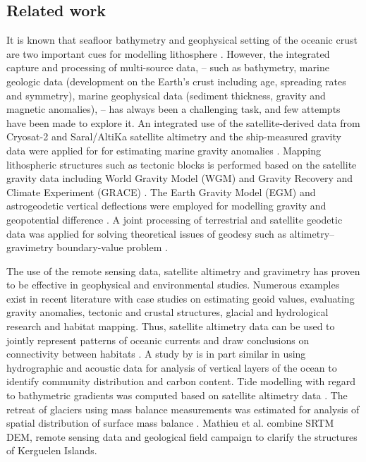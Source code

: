 \documentclass[geomatics,article,submit,pdftex,moreauthors]{Definitions/mdpi}
\begin{document}
\subsection{Related work}

It is known that seafloor bathymetry and geophysical setting of the oceanic crust are two important cues for modelling lithosphere \cite{WATSON201697}. However, the integrated capture and processing of multi-source data, -- such as bathymetry, marine geologic data (development on the Earth's crust including age, spreading rates and symmetry), marine geophysical data (sediment thickness, gravity and magnetic anomalies), -- has always been a challenging task, and few attempts have been made to explore it. An integrated use of the satellite-derived data from Cryosat-2 and Saral/AltiKa satellite altimetry and the ship-measured gravity data were applied for for estimating marine gravity anomalies \cite{NGUYEN2020505}. Mapping lithospheric structures such as tectonic blocks is performed based on the satellite gravity data including World Gravity Model (WGM) and Gravity Recovery and Climate Experiment (GRACE) \cite{EMISHAW2023104775}. The Earth Gravity Model (EGM) and astrogeodetic vertical deflections were employed for modelling gravity  and geopotential difference \cite{WANG2023}. A joint processing of terrestrial and satellite geodetic data was applied for solving theoretical issues of geodesy such as altimetry–gravimetry boundary-value problem \cite{Lehmann}.

The use of the remote sensing data, satellite altimetry and gravimetry has proven to be effective in geophysical and environmental studies. Numerous examples exist in recent literature with case studies on estimating geoid values, evaluating gravity anomalies, tectonic and crustal structures, glacial and hydrological research and habitat mapping. Thus, satellite altimetry data can be used to jointly represent patterns of oceanic currents and draw conclusions on connectivity between habitats \cite{MORI201645}. A study by \cite{COTTE2022103650} is in part similar in using hydrographic and acoustic data for analysis of vertical layers of the ocean to identify community distribution and carbon content. Tide modelling with regard to bathymetric gradients was computed based on satellite altimetry data \cite{Maraldi}. The retreat of glaciers using mass balance measurements was estimated for analysis of spatial distribution of surface mass balance \cite{Verfaillie}. Mathieu et al. \cite{MATHIEU2011206} combine SRTM DEM, remote sensing data and geological field campaign to clarify the structures of Kerguelen Islands. 
\end{document}
